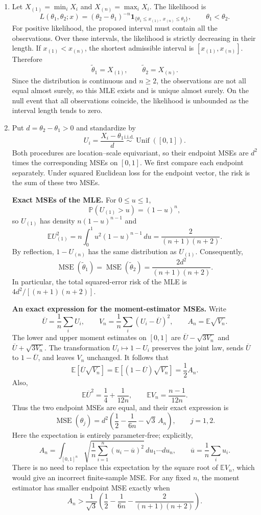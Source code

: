 \documentclass[lang=en,11pt,a4paper,citestyle=authoryear]{elegantpaper}
\newcommand{\E}{\mathbb{E}}
\renewcommand{\P}{\mathbb{P}}
\begin{document}
\begin{enumerate}[label=(\roman*),leftmargin=*]
\item Let $X_{(1)}=\min_iX_i$ and $X_{(n)}=\max_iX_i$.
The likelihood is
\[
L(\theta_1,\theta_2;x)
=(\theta_2-\theta_1)^{-n}
\mathbf1_{\{\theta_1\le x_{(1)},\ x_{(n)}\le\theta_2\}},
\qquad\theta_1<\theta_2.
\]
For positive likelihood, the proposed interval must contain all the
observations. Over these intervals, the likelihood is strictly decreasing
in their length. If $x_{(1)}<x_{(n)}$, the shortest admissible interval is
$[x_{(1)},x_{(n)}]$. Therefore
\[
{\widetilde\theta_1=X_{(1)},\qquad
\widetilde\theta_2=X_{(n)}.}
\]
Since the distribution is continuous and $n\ge2$, the observations
are not all equal almost surely, so this MLE exists and is unique
almost surely. On the null event that all observations coincide,
the likelihood is unbounded as the interval length tends to zero.

\item Put $d=\theta_2-\theta_1>0$ and standardize by
\[
U_i=\frac{X_i-\theta_1}{d}
\overset{\mathrm{i.i.d.}}{\sim}\operatorname{Unif}([0,1]).
\]
Both procedures are location--scale equivariant, so their endpoint
MSEs are $d^2$ times the corresponding MSEs on $[0,1]$.
We first compare each endpoint separately. Under squared Euclidean
loss for the endpoint vector, the risk is the sum of these two MSEs.

\medskip
\noindent\textbf{Exact MSEs of the MLE.}
For $0\le u\le1$,
\[
\P(U_{(1)}>u)=(1-u)^n,
\]
so $U_{(1)}$ has density $n(1-u)^{n-1}$ and
\[
\E U_{(1)}^2
=n\int_0^1u^2(1-u)^{n-1}\,du
=\frac{2}{(n+1)(n+2)}.
\]
By reflection, $1-U_{(n)}$ has the same distribution as $U_{(1)}$.
Consequently,
\[
{
\operatorname{MSE}(\widetilde\theta_1)
=\operatorname{MSE}(\widetilde\theta_2)
=\frac{2d^2}{(n+1)(n+2)}.}
\]
In particular, the total squared-error risk of the MLE is
$4d^2/[(n+1)(n+2)]$.

\medskip
\noindent\textbf{An exact expression for the moment-estimator MSEs.}
Write
\[
\overline U=\frac1n\sum_iU_i,
\qquad V_n=\frac1n\sum_i(U_i-\overline U)^2,
\qquad A_n=\E\sqrt{V_n}.
\]
The lower and upper moment estimates on $[0,1]$ are
$\overline U-\sqrt{3V_n}$ and $\overline U+\sqrt{3V_n}$.
The transformation $U_i\mapsto1-U_i$ preserves the joint law,
sends $\overline U$ to $1-\overline U$, and leaves $V_n$ unchanged.
It follows that
\[
\E[\overline U\sqrt{V_n}]
=\E[(1-\overline U)\sqrt{V_n}]
=\frac12 A_n.
\]
Also,
\[
\E\overline U^2=\frac14+\frac1{12n},
\qquad \E V_n=\frac{n-1}{12n}.
\]
Thus the two endpoint MSEs are equal, and their exact expression is
\[
{
\operatorname{MSE}(\widehat\theta_j)
=d^2\left(\frac12-\frac1{6n}-\sqrt3\,A_n\right),
\qquad j=1,2.}
\]
Here the expectation is entirely parameter-free; explicitly,
\[
A_n=\int_{[0,1]^n}
\sqrt{\frac1n\sum_{i=1}^n(u_i-\overline u)^2}
\,du_1\cdots du_n,
\qquad \overline u=\frac1n\sum_i u_i.
\]
There is no need to replace this expectation by the square root
of $\E V_n$, which would give an incorrect finite-sample MSE.
For any fixed $n$, the moment estimator has smaller endpoint MSE
exactly when
\[
A_n>
\frac1{\sqrt3}\left(
\frac12-\frac1{6n}-\frac{2}{(n+1)(n+2)}
\right).
\]


\end{enumerate}
\end{document}

